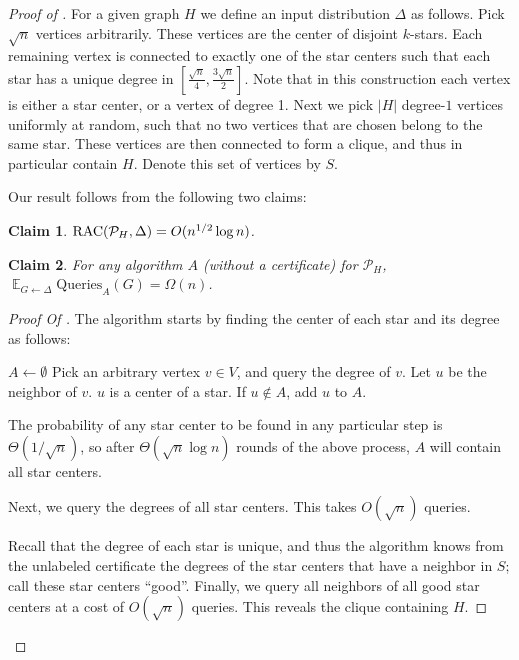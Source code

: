 \documentclass[11pt]{article}
\numberwithin{equation}{section}
\newtheorem{claim}[claim]{Claim}
\newcommand\E{\mathop{\mathbb E}}
\newcommand{\Query}{\text{Queries}}
\renewcommand{\P}{\mathcal{P}}
\newcommand{\1}{\mathbf{1}}
\begin{document}
\begin{proof}[Proof of ]
For a given graph $H$ we define an input distribution $\Delta$ as follows. Pick $\sqrt{n}$ vertices arbitrarily. These vertices are the center of disjoint $k$-stars. Each remaining vertex is connected to exactly one of the star centers such that each star has a unique degree in $[\frac{\sqrt{n}}{4}, \frac{3 \sqrt{n}}{2}]$. Note that in this construction each vertex is either a star center, or a vertex of degree 1. Next we pick $|H|$ degree-$1$ vertices uniformly at random, such that no two vertices that are chosen belong to the same star. These vertices are then connected to form a clique, and thus in particular contain $H$. Denote this set of vertices by $S$.



Our result follows from the following two claims:
\begin{claim} \label{claim:star:upperbound}
$\RACC(\P_H, \Delta) = O(n^{1/2} \log n)$.
\end{claim}

\begin{claim} \label{claim:star:lowerbound}
For any algorithm $A$ (without a certificate) for $\P_H$, $\E_{G \leftarrow \Delta} \Query_A(G) = \Omega(n)$.\end{claim}

\begin{proof} [Proof Of ]

The algorithm starts by finding the center of each star and its degree as follows:
\begin{algorithmic}

\State $A \leftarrow \emptyset$
\State Pick an arbitrary vertex $v \in V$, and query the degree of $v$.
\State Let $u$ be the neighbor of $v$. $u$ is a center of a star. If $u \notin A$, add $u$ to $A$.
\iffalse
\If {$\text{deg}(v) \leq |H|+1$}
\State $v$ participates in the copy of $H$. Query all pairs of neighbors of $v$.
\Else
\State $v$ is a center of a star.
\EndIf
\fi
\EndIf
\EndFor
\end{algorithmic}
The probability of any star center to be found in any particular step is $\Theta(1/\sqrt{n})$, so after $\Theta(\sqrt{n} \log n)$ rounds of the above process, $A$ will contain all star centers.

Next, we query the degrees of all star centers. This takes $O(\sqrt{n})$ queries.

Recall that the degree of each star is unique, and thus the algorithm knows from the unlabeled certificate the degrees of the star centers that have a neighbor in $S$; call these star centers ``good''. Finally, we query all neighbors of all good star centers at a cost of $O(\sqrt{n})$ queries. This reveals the clique containing $H$.
\end{proof}



\end{proof}
\end{document}

